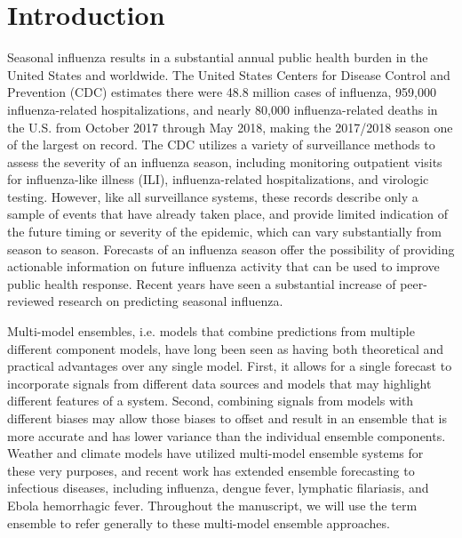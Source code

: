 \documentclass{article}\usepackage[]{graphicx}\usepackage[]{color}
\begin{document}
\section*{Introduction}
Seasonal influenza results in a substantial annual public health burden in the United States and worldwide.
The United States Centers for Disease Control and Prevention (CDC) estimates there were 48.8 million cases of influenza, 959,000 influenza-related hospitalizations, and nearly 80,000 influenza-related deaths in the U.S. from October 2017 through May 2018, making the 2017/2018 season one of the largest on record.\cite{CDC2018-estimates} 
The CDC utilizes a variety of surveillance methods to assess the severity of an influenza season, including monitoring outpatient visits for influenza-like illness (ILI), influenza-related hospitalizations, and virologic testing.\cite{surv2017} 
However, like all surveillance systems, these records describe only a sample of events that have already taken place, and provide limited indication of the future timing or severity of the epidemic, which can vary substantially from season to season.\cite{CDC2018} 
Forecasts of an influenza season offer the possibility of providing actionable information on future influenza activity that can be used to improve public health response. 
Recent years have seen a substantial increase of peer-reviewed research on predicting seasonal influenza.\cite{Shaman2013,Yang2014,Yang2015,Chretien2016,Kandula2017,osthus2018dynamic,Brooks2018,Pei2018}

Multi-model ensembles, i.e. models that combine predictions from multiple different component models, have long been seen as having both theoretical and practical advantages over any single model.\cite{bates1969combination,Wolpert1992,Polikar2006,Hastie2009}
First, it allows for a single forecast to incorporate signals from different data sources and models that may highlight different features of a system. 
Second, combining signals from models with different biases may allow those biases to offset and result in an ensemble that is more accurate and has lower variance than the individual ensemble components. Weather and climate models have utilized multi-model ensemble systems for these very purposes\cite{krishnamurti1999improved,Palmer2002,Raftery2005,Leutbecher2008}, and recent work has extended ensemble forecasting to infectious diseases, including influenza, dengue fever, lymphatic filariasis, and Ebola hemorrhagic fever.\cite{Yamana2017,Smith2017,Viboud2017,Ray2018} 
Throughout the manuscript, we will use the term ensemble to refer generally to these multi-model ensemble approaches.
\end{document}
